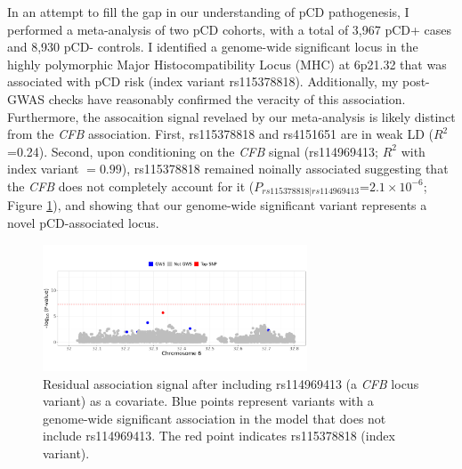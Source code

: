 In an attempt to fill the gap in our understanding of pCD pathogenesis, I performed a meta-analysis of two pCD cohorts, with a total of 3,967 pCD+ cases and 8,930 pCD- controls. I identified a genome-wide significant locus in the highly polymorphic Major Histocompatibility Locus (MHC) at 6p21.32 that was associated with pCD risk (index variant rs115378818). Additionally, my post-GWAS checks have reasonably confirmed the veracity of this association. Furthermore, the assocaition signal revelaed by our meta-analysis is likely distinct from the \textit{CFB} association. First, rs115378818 and rs4151651 are in weak LD ($R^{2}$=0.24). Second, upon conditioning on the \textit{CFB} signal (rs114969413; $R^{2}$ with index variant $=0.99$), rs115378818 remained noinally associated suggesting that the \textit{CFB} does not completely account for it ($P_{rs115378818|rs114969413}$=$2.1\times10^{-6}$; Figure \ref{fig:cond_mcgovern}), and showing that our genome-wide significant variant represents a novel pCD-associated locus. \\

\begin{figure}
  \centering    
  \includegraphics[width=0.7\textwidth]{Vector/cond_mcgovern_regional_assoc_plot}
  \caption[Figure]{Residual association signal after including  rs114969413 (a \textit{CFB} locus variant) as a covariate. Blue points represent variants with a genome-wide significant association in the model that does not include rs114969413. The red point indicates rs115378818 (index variant).}
  \label{fig:cond_mcgovern}
  \end{figure}
  
